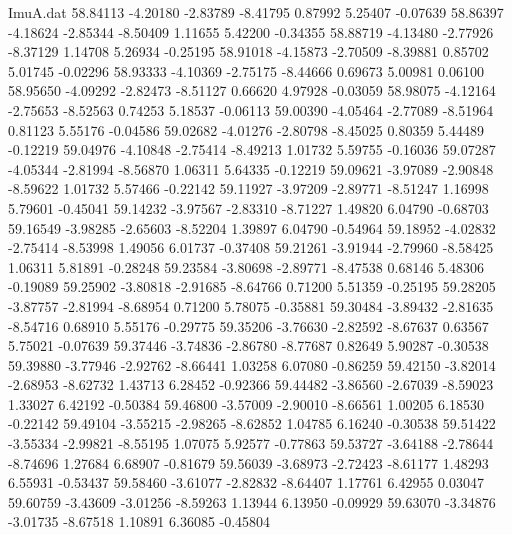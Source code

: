 \begin{filecontents}{ImuA.dat}
  58.84113   -4.20180   -2.83789   -8.41795    0.87992    5.25407   -0.07639
  58.86397   -4.18624   -2.85344   -8.50409    1.11655    5.42200   -0.34355
  58.88719   -4.13480   -2.77926   -8.37129    1.14708    5.26934   -0.25195
  58.91018   -4.15873   -2.70509   -8.39881    0.85702    5.01745   -0.02296
  58.93333   -4.10369   -2.75175   -8.44666    0.69673    5.00981    0.06100
  58.95650   -4.09292   -2.82473   -8.51127    0.66620    4.97928   -0.03059
  58.98075   -4.12164   -2.75653   -8.52563    0.74253    5.18537   -0.06113
  59.00390   -4.05464   -2.77089   -8.51964    0.81123    5.55176   -0.04586
  59.02682   -4.01276   -2.80798   -8.45025    0.80359    5.44489   -0.12219
  59.04976   -4.10848   -2.75414   -8.49213    1.01732    5.59755   -0.16036
  59.07287   -4.05344   -2.81994   -8.56870    1.06311    5.64335   -0.12219
  59.09621   -3.97089   -2.90848   -8.59622    1.01732    5.57466   -0.22142
  59.11927   -3.97209   -2.89771   -8.51247    1.16998    5.79601   -0.45041
  59.14232   -3.97567   -2.83310   -8.71227    1.49820    6.04790   -0.68703
  59.16549   -3.98285   -2.65603   -8.52204    1.39897    6.04790   -0.54964
  59.18952   -4.02832   -2.75414   -8.53998    1.49056    6.01737   -0.37408
  59.21261   -3.91944   -2.79960   -8.58425    1.06311    5.81891   -0.28248
  59.23584   -3.80698   -2.89771   -8.47538    0.68146    5.48306   -0.19089
  59.25902   -3.80818   -2.91685   -8.64766    0.71200    5.51359   -0.25195
  59.28205   -3.87757   -2.81994   -8.68954    0.71200    5.78075   -0.35881
  59.30484   -3.89432   -2.81635   -8.54716    0.68910    5.55176   -0.29775
  59.35206   -3.76630   -2.82592   -8.67637    0.63567    5.75021   -0.07639
  59.37446   -3.74836   -2.86780   -8.77687    0.82649    5.90287   -0.30538
  59.39880   -3.77946   -2.92762   -8.66441    1.03258    6.07080   -0.86259
  59.42150   -3.82014   -2.68953   -8.62732    1.43713    6.28452   -0.92366
  59.44482   -3.86560   -2.67039   -8.59023    1.33027    6.42192   -0.50384
  59.46800   -3.57009   -2.90010   -8.66561    1.00205    6.18530   -0.22142
  59.49104   -3.55215   -2.98265   -8.62852    1.04785    6.16240   -0.30538
  59.51422   -3.55334   -2.99821   -8.55195    1.07075    5.92577   -0.77863
  59.53727   -3.64188   -2.78644   -8.74696    1.27684    6.68907   -0.81679
  59.56039   -3.68973   -2.72423   -8.61177    1.48293    6.55931   -0.53437
  59.58460   -3.61077   -2.82832   -8.64407    1.17761    6.42955    0.03047
  59.60759   -3.43609   -3.01256   -8.59263    1.13944    6.13950   -0.09929
  59.63070   -3.34876   -3.01735   -8.67518    1.10891    6.36085   -0.45804

\end{filecontents}
